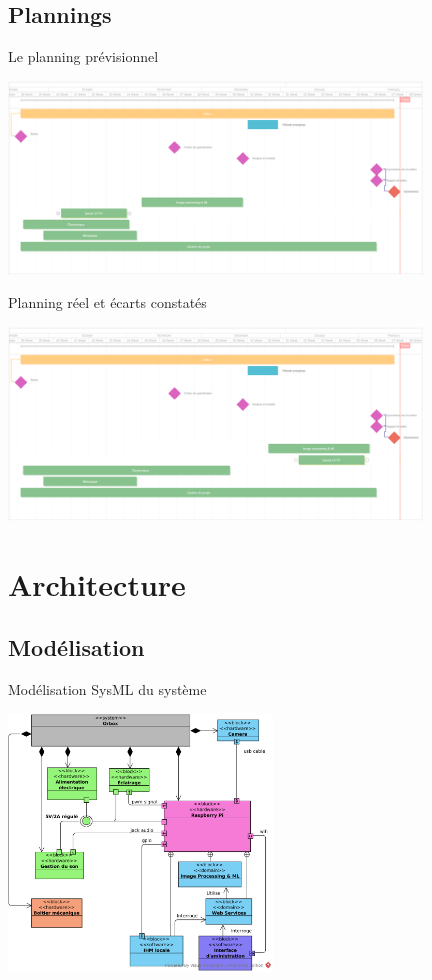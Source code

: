 \documentclass{beamer}
\begin{document}
\subsection{Plannings}
\begin{frame}{Le planning prévisionnel}
\begin{center}
    \includegraphics[width=11cm]{ganttproInit}
\end{center}
\end{frame}
\begin{frame}{Planning réel et écarts constatés}
\begin{center}
    \includegraphics[width=11cm]{ganttproFinal}
\end{center}
\end{frame}

\section{Architecture}
\subsection{Modélisation}
\begin{frame}{Modélisation SysML du système}
  \begin{center}
    \includegraphics[width=7cm]{SysML_Top_BDD}
\end{center}
\end{frame}
\end{document}
